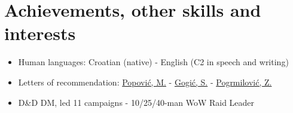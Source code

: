 \documentclass[a4paper]{article}
\begin{document}
\section{Achievements, other skills and interests}

\begin{itemize}
  \item Human languages: Croatian (native) - English (C2 in speech and writing)
  \item Letters of recommendation: \href{https://github.com/MislavJaksic/Latex-Overleaf/blob/master/CV/AISoft_Popovic.pdf}{Popović, M.} - \href{https://github.com/MislavJaksic/Latex-Overleaf/blob/master/CV/Atos_Gogic.pdf}{Gogić, S.} - \href{https://github.com/MislavJaksic/Latex-Overleaf/blob/master/CV/Atos_Pogrmilovic.pdf}{Pogrmilović, Z.}
  \item D\&D DM, led 11 campaigns - 10/25/40-man WoW Raid Leader
\end{itemize}
\end{document}
